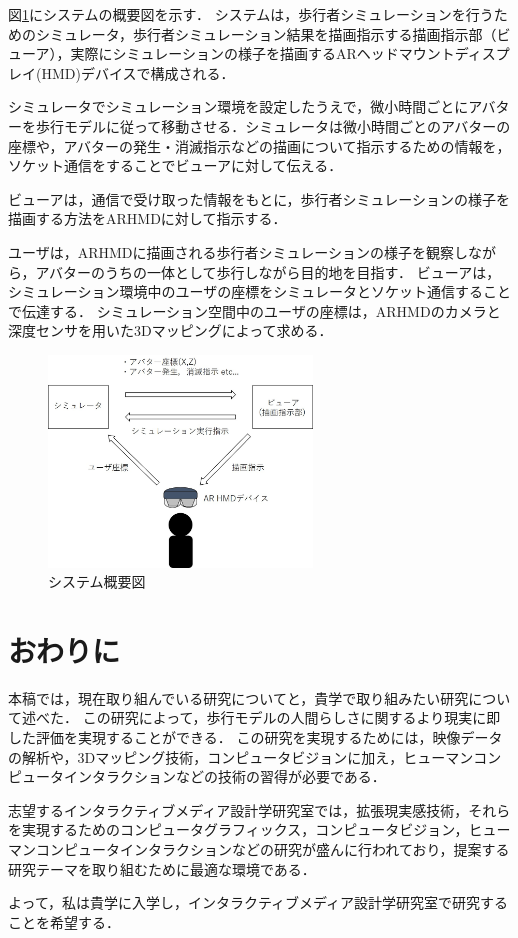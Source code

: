 \documentclass[twocolumn]{jarticle}%
\begin{document}
図\ref{fig:systemImage}にシステムの概要図を示す．
システムは，歩行者シミュレーションを行うためのシミュレータ，歩行者シミュレーション結果を描画指示する描画指示部（ビューア），実際にシミュレーションの様子を描画するARヘッドマウントディスプレイ(HMD)デバイスで構成される．

シミュレータでシミュレーション環境を設定したうえで，微小時間ごとにアバターを歩行モデルに従って移動させる．シミュレータは微小時間ごとのアバターの座標や，アバターの発生・消滅指示などの描画について指示するための情報を，ソケット通信をすることでビューアに対して伝える．

ビューアは，通信で受け取った情報をもとに，歩行者シミュレーションの様子を描画する方法をARHMDに対して指示する．

ユーザは，ARHMDに描画される歩行者シミュレーションの様子を観察しながら，アバターのうちの一体として歩行しながら目的地を目指す．
ビューアは，シミュレーション環境中のユーザの座標をシミュレータとソケット通信することで伝達する．
シミュレーション空間中のユーザの座標は，ARHMDのカメラと深度センサを用いた3Dマッピングによって求める．

\begin{figure}[htbp]
  \begin{center}
    \includegraphics[width=70mm]{images/systemImage.jpg}
  \end{center}
    \caption{システム概要図}
    \label{fig:systemImage}
\end{figure}

\section{おわりに}
本稿では，現在取り組んでいる研究についてと，貴学で取り組みたい研究について述べた．
この研究によって，歩行モデルの人間らしさに関するより現実に即した評価を実現することができる．
この研究を実現するためには，映像データの解析や，3Dマッピング技術，コンピュータビジョンに加え，ヒューマンコンピュータインタラクションなどの技術の習得が必要である．

志望するインタラクティブメディア設計学研究室では，拡張現実感技術，それらを実現するためのコンピュータグラフィックス，コンピュータビジョン，ヒューマンコンピュータインタラクションなどの研究が盛んに行われており，提案する研究テーマを取り組むために最適な環境である．

よって，私は貴学に入学し，インタラクティブメディア設計学研究室で研究することを希望する．





\end{document}
